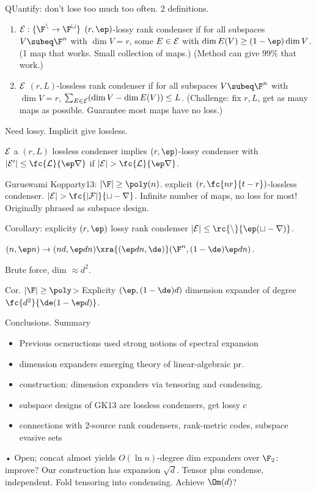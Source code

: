 QUantify: don't lose too much too often.
2 definitions.
\begin{df}
\begin{enumerate}
\item
$\cal E:\{\F^n\to \F^t\}$ $(r,\ep)$-lossy rank condenser if for all subspaces $V\subeq \F^n$ with $\dim V=r$, some $E\in \cal E$ with $\dim E(V)\ge (1-\ep)\dim V$. (1 map that works. Small collection of maps.) (Method can give $99\%$ that work.)
\item
$\cal E$ $(r,L)$-lossless rank condenser if for all subspaces $V\subeq \F^n$ with $\dim V=r$, $\sum_{E\in \cal E}(\dim V-\dim E(V))\le L$. (Challenge: fix $r,L$, get as many maps as possible. Guarantee most maps have no loss.)
\end{enumerate}
\end{df}

Need lossy. Implicit give lossless.
\begin{lem}
$\cal E$ a $(r,L)$ lossless condenser implies $(r,\ep)$-lossy condenser with $|\cal E'|\le \fc{L}{\ep r}$ if $|\cal E|>\fc{L}{\ep r}$.
\end{lem}

Guruswami Kopparty13: $|\F|\ge\poly(n)$. 
explicit $(r,\fc{nr}{t-r})$-lossless condenser. $|\cal E|>\fc{|F|}{t-r}$.
Infinite number of maps, no loss for most! Originally phrased as subspace design.


Corollary: explicity $(r,\ep)$ lossy rank condenser $|\cal E|\le \rc{n}{\ep(t-r)}$. 

$(n,\ep n)\to (nd, \ep dn)\xra{(\ep dn,\de)}(\F^n, (1-\de)\ep dn)$.

Brute force, dim $\approx d^2$.

Cor. $|\F|\ge \poly$> Explicity $(\ep,(1-\de)d)$ dimension expander of degree $\fc{d^2}{\de(1-\ep d)}$.

Conclusions. Summary
\begin{itemize}
\item
Previous ocnsructions used strong notions of spectral expansion
\item
dimension expanders emerging theory of linear-algebraic pr.
\item construction: dimension expanders via tensoring and condensing.
\item subspace designs of GK13 are lossless condensers, get lossy c
\item connections with 2-source rank condensers, rank-metric codes, subspace evasive sets
\end{itemize}•
Open; concat almost yields $O(\ln n)$-degree dim expanders over $\F_2$: improve? Our construction has expansion $\sqrt d$. Tensor plus condense, independent. Fold tensoring into condensing. Achieve $\Om(d)$?

